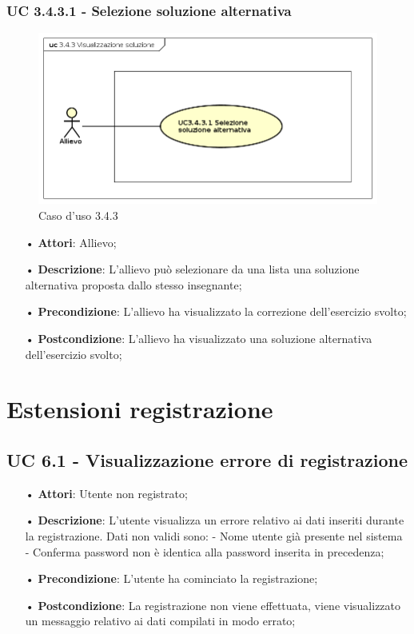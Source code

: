 \subsubsection{UC 3.4.3.1 - Selezione soluzione alternativa}
\begin{figure}[H]
\centering
\includegraphics[width=17cm]{img/UC343.png} 
\caption{Caso d'uso 3.4.3}\label{fig:343}
\end{figure}
\begin{itemize}
\item[•]\textbf{Attori}: Allievo;
\item[•]\textbf{Descrizione}: L’allievo può selezionare da una lista una soluzione alternativa proposta dallo stesso insegnante;
\item[•]\textbf{Precondizione}: L’allievo ha visualizzato la correzione dell’esercizio svolto;
\item[•]\textbf{Postcondizione}: L’allievo ha visualizzato una soluzione alternativa dell’esercizio svolto;
\end{itemize}

\section{Estensioni registrazione}
\subsection{UC 6.1 - Visualizzazione errore di registrazione}
\begin{itemize}
\item[•]\textbf{Attori}: Utente non registrato;
\item[•]\textbf{Descrizione}: L’utente visualizza un errore relativo ai dati inseriti durante la registrazione.
Dati non validi sono:
 - Nome utente già presente nel sistema
 - Conferma password non è identica alla password inserita in precedenza;
\item[•]\textbf{Precondizione}: L’utente ha cominciato la registrazione;
\item[•]\textbf{Postcondizione}: La registrazione non viene effettuata, viene visualizzato un messaggio relativo ai dati compilati in modo errato;
\end{itemize}


